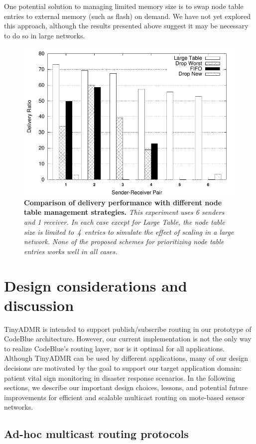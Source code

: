 One potential solution to managing limited memory size is to swap node 
table entries to external memory (such as flash) on demand. We have not
yet explored this approach, although the results presented above
suggest it may be necessary to do so in large networks.

\begin{figure}[t]
\begin{center}
\includegraphics[width=0.6\hsize]{resources/tinyadmr-techrept05/figures/lessons/tablesize/limited_table_size.pdf}
\end{center}
\caption{{\small {\bf Comparison of delivery performance 
with different node table management strategies.}
{\em This experiment uses 6 senders and 1 receiver.
In each case except for {\em Large Table},
the node table size is limited to~4~entries
to simulate the effect of scaling in a large network.
None of the proposed schemes for prioritizing node
table entries works well in all cases.}}}
\label{fig-routing-table-management}
\end{figure}

\section{Design considerations and discussion}


TinyADMR is intended to support publish/subscribe routing in our prototype of
CodeBlue architecture. However, our current implementation is not the only way
to realize CodeBlue's routing layer, nor is it optimal for all applications.
Although TinyADMR can be used by different applications, many of our design
decisions are motivated by the goal to support our target application domain:
patient vital sign monitoring in disaster response scenarios. In the following
sections, we describe our important design choices, lessons, and potential future
improvements for efficient and scalable multicast routing on
mote-based sensor networks.

\subsection{Ad-hoc multicast routing protocols}

